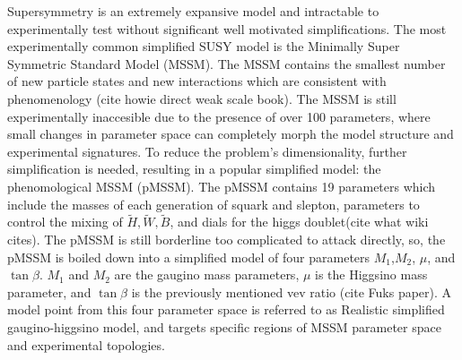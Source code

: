Supersymmetry is an extremely expansive model and intractable to experimentally test without significant well motivated simplifications. The most experimentally common simplified SUSY model is the Minimally Super Symmetric Standard Model (MSSM). The MSSM contains the smallest number of new particle states and new interactions which are consistent with phenomenology (cite howie direct weak scale book). The MSSM is still experimentally inaccesible due to the presence of over 100 parameters, where small changes in parameter space can completely morph the model structure and experimental signatures. To reduce the problem's dimensionality, further simplification is needed, resulting in a popular simplified model: the phenomological MSSM (pMSSM). The pMSSM contains 19 parameters which include the masses of each generation of squark and slepton, parameters to control the mixing of $\tilde{H}, \tilde{W}, \tilde{B}$, and dials for the higgs doublet(cite what wiki cites).  The pMSSM is still borderline too complicated to attack directly, so, the pMSSM is boiled down into a simplified model of four parameters $M_1$,$M_2$, $\mu$, and $\tan\beta$. $M_1$ and $M_2$ are the gaugino mass parameters, $\mu$ is the Higgsino mass parameter, and $\tan\beta$ is the previously mentioned vev ratio (cite Fuks paper).  A model point from this four parameter space is referred to as Realistic simplified gaugino-higgsino model, and targets specific regions of MSSM parameter space and experimental topologies.

